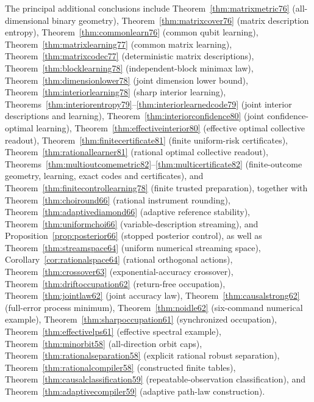 \documentclass[11pt]{amsart}
\numberwithin{equation}{section}
\theoremstyle{definition}\newtheorem{definition}[theorem]{Definition}
\theoremstyle{remark}\newtheorem{remark}[theorem]{Remark}
\begin{document}
\noindent The principal additional conclusions include
Theorem~\ref{thm:matrixmetric76} (all-dimensional binary geometry),
Theorem~\ref{thm:matrixcover76} (matrix description entropy),
Theorem~\ref{thm:commonlearn76} (common qubit learning),
Theorem~\ref{thm:matrixlearning77} (common matrix learning),
Theorem~\ref{thm:matrixcodec77} (deterministic matrix descriptions),
Theorem~\ref{thm:blocklearning78} (independent-block minimax law),
Theorem~\ref{thm:dimensionlower78} (joint dimension lower bound),
Theorem~\ref{thm:interiorlearning78} (sharp interior learning),
Theorems~\ref{thm:interiorentropy79}--\ref{thm:interiorlearnedcode79}
(joint interior descriptions and learning),
Theorem~\ref{thm:interiorconfidence80} (joint confidence-optimal learning),
Theorem~\ref{thm:effectiveinterior80} (effective optimal collective readout),
Theorem~\ref{thm:finitecertificate81} (finite uniform-risk certificates),
Theorem~\ref{thm:rationallearner81} (rational optimal collective readout),
Theorems~\ref{thm:multioutcomemetric82}--\ref{thm:multicertificate82}
(finite-outcome geometry, learning, exact codes and certificates),
and Theorem~\ref{thm:finitecontrollearning78} (finite trusted preparation),
together with
Theorem~\ref{thm:choiround66} (rational instrument rounding),
Theorem~\ref{thm:adaptivediamond66} (adaptive reference stability),
Theorem~\ref{thm:uniformchoi66} (variable-description streaming),
and Proposition~\ref{prop:posterior66} (stopped posterior control),
as well as
Theorem~\ref{thm:streamspace64} (uniform numerical streaming space),
Corollary~\ref{cor:rationalspace64} (rational orthogonal actions),
Theorem~\ref{thm:crossover63} (exponential-accuracy crossover),
Theorem~\ref{thm:driftoccupation62} (return-free occupation),
Theorem~\ref{thm:jointlaw62} (joint accuracy law),
Theorem~\ref{thm:causalstrong62} (full-error process minimum),
Theorem~\ref{thm:noidle62} (six-command numerical example),
Theorem~\ref{thm:sharpoccupation61} (synchronized occupation),
Theorem~\ref{thm:effectivelps61} (effective spectral example),
Theorem~\ref{thm:minorbit58} (all-direction orbit caps),
Theorem~\ref{thm:rationalseparation58} (explicit rational robust separation),
Theorem~\ref{thm:rationalcompiler58} (constructed finite tables),
Theorem~\ref{thm:causalclassification59} (repeatable-observation
classification), and Theorem~\ref{thm:adaptivecompiler59} (adaptive
path-law construction).






\end{document}
